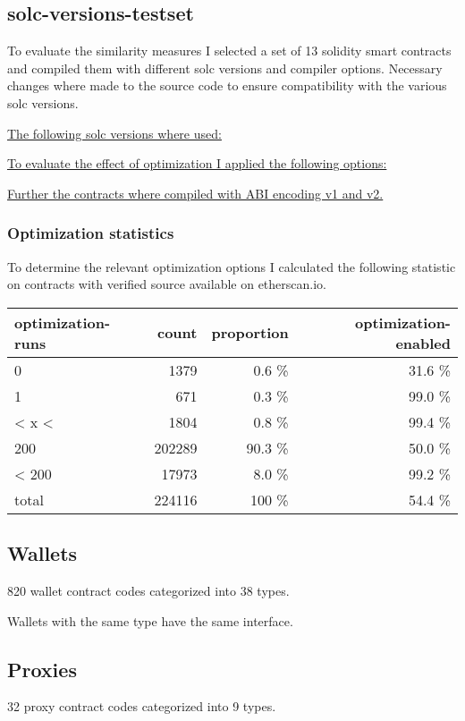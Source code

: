 \documentclass[../main.tex]{subfiles}
\begin{document}
\subsection{solc-versions-testset \cite{solc-versions-testset}}
To evaluate the similarity measures I selected a set of 13 solidity smart contracts and compiled
them with different solc versions and compiler options.
Necessary changes where made to the source code to ensure compatibility with the various solc
versions.

\underline{The following solc versions where used:}
\begin{ol}
  \item {}
  \item {}
  \item {}
  \item {}
\end{ol}
\underline{To evaluate the effect of optimization I applied the following options:}
\begin{ol}
  \item {}
  \item {}
  \item {}
  \item {}
\end{ol}
\underline{Further the contracts where compiled with ABI encoding v1 and v2.}

\subsubsection{Optimization statistics}

To determine the relevant optimization options I calculated the following statistic on contracts with verified source available on etherscan.io.

\begin{tabular}{lrrr}
  optimization-runs & count  & proportion & optimization-enabled \\
  \hline
  0                 & 1379   & 0.6 \%     & 31.6 \%              \\
  1                 & 671    & 0.3 \%     & 99.0 \%              \\
  < x <             & 1804   & 0.8 \%     & 99.4 \%              \\
  200               & 202289 & 90.3 \%    & 50.0 \%              \\
  < 200             & 17973  & 8.0 \%     & 99.2 \%              \\
  \hline
  total             & 224116 & 100 \%     & 54.4 \%
\end{tabular}

\subsection{Wallets}
820 wallet contract codes categorized into 38 types.

Wallets with the same type have the same interface.


\subsection{Proxies}
32 proxy contract codes categorized into 9 types.

\end{document}
